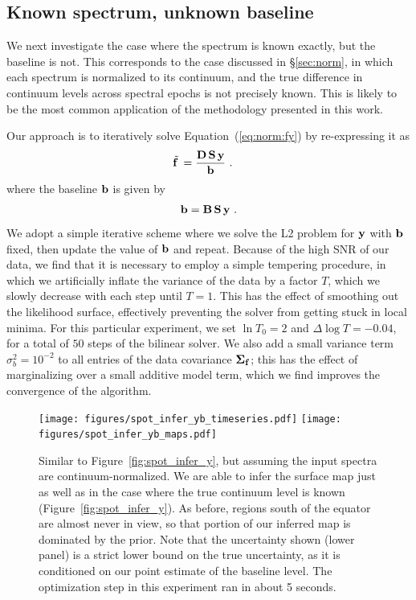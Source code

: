 \documentclass[modern]{aastex631}
\def\timeInferYB{about 5 seconds}
\begin{document}
\subsection{Known spectrum, unknown baseline}
\label{sec:spot_y1b}
%
We next investigate the case where the spectrum is known exactly, but the baseline is not. 
This corresponds to the case discussed in
\S\ref{sec:norm}, in which each spectrum is normalized to its continuum, and the true difference in continuum levels across spectral epochs is not precisely known.
This is likely to be the most common application of the methodology presented in this work.

Our approach is to iteratively solve Equation~(\ref{eq:norm:fy}) by re-expressing it as
%
\begin{align}
    \tilde{{\mathbf{f}}\hspace{0.2em}}
     & =
    \frac{
        {\mathbf{D}}
        \,
        {\mathbf{S}}
        \,
        {\mathbf{y}}
    }{
        {\mathbf{b}}
    }
    \hskip 0.33em.
\end{align}
%
where the baseline ${\mathbf{b}}$ is given by
%
\begin{align}
    {\ensuremath{\mathbf{b}}}
    =
    {\mathbf{B}}
    \,
    {\mathbf{S}}
    \,
    {\mathbf{y}}
    \hskip 0.33em.
\end{align}
%
We adopt a simple iterative scheme where we solve the L2 problem for ${\mathbf{y}}$ with ${\mathbf{b}}$ fixed, then update the value of ${\mathbf{b}}$ and repeat.
Because of the high SNR of our data, we find that it is necessary to employ a simple tempering procedure, in which we artificially inflate the variance of the data by a factor $T$, which we slowly decrease with each step until $T = 1$. 
This has the effect of smoothing out the likelihood surface, effectively preventing the solver from getting stuck in local minima.
For this particular experiment, we set $\ln T_0 = 2$ and $\Delta \log T = -0.04$, for a total of $50$ steps of the bilinear solver.
We also add a small variance term $\sigma_b^2 = 10^{-2}$ to all entries of the data covariance $\boldsymbol{\Sigma}_{{\mathbf{f}}}$; this has the effect of marginalizing over a small additive model term, which we find improves the convergence of the algorithm.

\begin{figure}[p!]
    \begin{centering}
        \texttt{[image: figures/spot\_infer\_yb\_timeseries.pdf]}
        \texttt{[image: figures/spot\_infer\_yb\_maps.pdf]}
        \caption{%
            Similar to Figure~\ref{fig:spot_infer_y}, but assuming the input spectra are continuum-normalized.
            We are able to infer the surface map just as
            well as in the case where the true continuum level
            is known (Figure~\ref{fig:spot_infer_y}). As before,
            regions south of the equator are almost never in view, so that portion of our inferred map is dominated by the prior.
            Note that the uncertainty shown (lower panel) is a strict lower bound on the true uncertainty, as it is conditioned on our point estimate of the baseline level.
            The optimization step in this experiment ran in \timeInferYB.
        }
        \label{fig:spot_infer_yb}
    \end{centering}
\end{figure}
\end{document}
